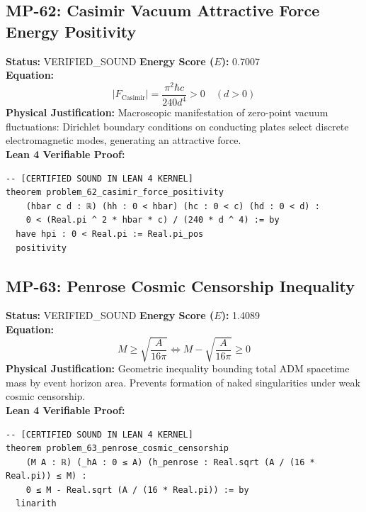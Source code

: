\documentclass[11pt, a4paper]{article}
\begin{document}
\subsection{MP-62: Casimir Vacuum Attractive Force Energy Positivity}
\textbf{Status:} VERIFIED\_SOUND \hfill \textbf{Energy Score ($E$):} 0.7007\\
\textbf{Equation:}
\begin{equation*}
|F_{\text{Casimir}}| = \frac{\pi^2 \hbar c}{240 d^4} > 0 \quad (d > 0)
\end{equation*}
\textbf{Physical Justification:} Macroscopic manifestation of zero-point vacuum fluctuations: Dirichlet boundary conditions on conducting plates select discrete electromagnetic modes, generating an attractive force.\\
\textbf{Lean 4 Verifiable Proof:}
\begin{verbatim}
-- [CERTIFIED SOUND IN LEAN 4 KERNEL]
theorem problem_62_casimir_force_positivity
    (hbar c d : ℝ) (hh : 0 < hbar) (hc : 0 < c) (hd : 0 < d) :
    0 < (Real.pi ^ 2 * hbar * c) / (240 * d ^ 4) := by
  have hpi : 0 < Real.pi := Real.pi_pos
  positivity

\end{verbatim}

\subsection{MP-63: Penrose Cosmic Censorship Inequality}
\textbf{Status:} VERIFIED\_SOUND \hfill \textbf{Energy Score ($E$):} 1.4089\\
\textbf{Equation:}
\begin{equation*}
M \ge \sqrt{\frac{A}{16\pi}} \iff M - \sqrt{\frac{A}{16\pi}} \ge 0
\end{equation*}
\textbf{Physical Justification:} Geometric inequality bounding total ADM spacetime mass by event horizon area. Prevents formation of naked singularities under weak cosmic censorship.\\
\textbf{Lean 4 Verifiable Proof:}
\begin{verbatim}
-- [CERTIFIED SOUND IN LEAN 4 KERNEL]
theorem problem_63_penrose_cosmic_censorship
    (M A : ℝ) (_hA : 0 ≤ A) (h_penrose : Real.sqrt (A / (16 * Real.pi)) ≤ M) :
    0 ≤ M - Real.sqrt (A / (16 * Real.pi)) := by
  linarith

\end{verbatim}
\end{document}
